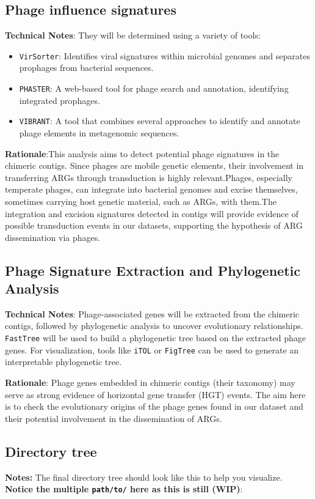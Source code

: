\documentclass[11pt]{report}
\begin{document}
\subsection{Phage influence signatures}
\textbf{Technical Notes}: They will be determined using a variety of tools:
\begin{itemize}
	\item \texttt{VirSorter}: Identifies viral signatures within microbial genomes and separates prophages from bacterial sequences.
	\item \texttt{PHASTER}: A web-based tool for phage search and annotation, identifying integrated prophages.
	\item \texttt{VIBRANT}: A tool that combines several approaches to identify and annotate phage elements in metagenomic sequences.
\end{itemize}
\textbf{Rationale}:This analysis aims to detect potential phage signatures in the chimeric contigs. Since phages are mobile genetic elements, their involvement in transferring ARGs through transduction is highly relevant.Phages, especially temperate phages, can integrate into bacterial genomes and excise themselves, sometimes carrying host genetic material, such as ARGs, with them.The integration and excision signatures detected in contigs will provide evidence of possible transduction events in our datasets, supporting the hypothesis of ARG dissemination via phages.


\subsection{Phage Signature Extraction and Phylogenetic Analysis}
\textbf{Technical Notes}: Phage-associated genes will be extracted from the chimeric contigs, followed by phylogenetic analysis to uncover evolutionary relationships. \texttt{FastTree} will be used to build a phylogenetic tree based on the extracted phage genes. For visualization, tools like \texttt{iTOL} or \texttt{FigTree} can be used to generate an interpretable phylogenetic tree.

\textbf{Rationale}: Phage genes embedded in chimeric contigs (their taxonomy) may serve as strong evidence of horizontal gene transfer (HGT) events. The aim here is to check the evolutionary origins of the phage genes found in our dataset and their potential involvement in the dissemination of ARGs.

\subsection{Directory tree}
\textbf{Notes:} The final directory tree should look like this to help you visualize. \textbf{Notice the multiple \texttt{path/to/} here as this is still (WIP)}:
\end{document}
